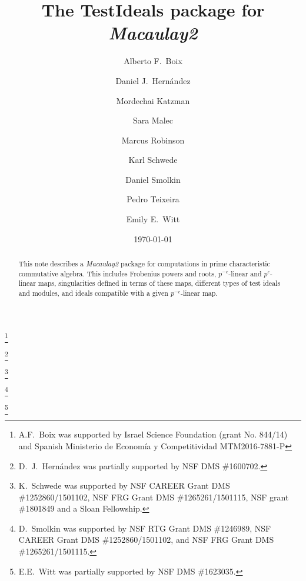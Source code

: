 \documentclass{amsart}
\begin{document}
\title{The  {TestIdeals} package for \emph{Macaulay2}}
\author[Alberto F.\ Boix et at.]{Alberto F.\ Boix}
\address{Department of Mathematics, Ben-Gurion University of the Negev, Beer-Sheva 8410501, Israel}
\thanks{A.F.~Boix was supported by Israel Science Foundation (grant No. 844/14) and Spanish Ministerio de Econom\'ia y Competitividad MTM2016-7881-P}

\author[]{Daniel J.\ Hern\'andez}
\address{Department of Mathematics, University of Kansas, Lawrence, KS~66045, USA}
\thanks{D.~J.~Hern\'andez was partially supported by NSF DMS \#1600702.}

\author[]{Mordechai Katzman}
\address{Department of Pure Mathematics, University of Sheffield, Sheffield S37RH, United Kingdom}

\author[]{Sara Malec}
\address{Department of Mathematics, Hood College, Frederick, MD 21701}

\author[]{Marcus Robinson}
\address{Department of Mathematics, University of Utah, Salt Lake City, UT~84112, USA}

\author[]{Karl Schwede}
\address{Department of Mathematics, University of Utah, Salt Lake City, UT~84112, USA}
\thanks{K.~Schwede was supported by NSF CAREER Grant DMS \#1252860/1501102, NSF FRG Grant DMS \#1265261/1501115, NSF grant \#1801849 and a Sloan Fellowship.}

\author[]{Daniel Smolkin}
\address{Department of Mathematics, University of Utah, Salt Lake City, UT~84112, USA}
\thanks{D.~Smolkin was supported by NSF RTG Grant DMS \#1246989, NSF CAREER Grant DMS \#1252860/1501102, and NSF FRG Grant DMS \#1265261/1501115.}

\author[]{Pedro Teixeira}
\address{Department of Mathematics, Knox College, Galesburg, IL~61401, USA}

\author[]{Emily E.\ Witt}
\address{Department of Mathematics, University of Kansas, Lawrence, KS~66045, USA}
\thanks{E.E.~Witt was partially supported by NSF DMS \#1623035.}
\date{\today}

\begin{abstract}
	This note describes a \emph{Macaulay2} package for computations in prime characteristic commutative algebra.  This includes Frobenius powers and roots, $p^{-e}$-linear and $p^{e}$-linear  maps,
  singularities defined in terms of these maps, different types of test ideals and modules, and ideals compatible with a given $p^{-e}$-linear map.
\end{abstract}
\end{document}
